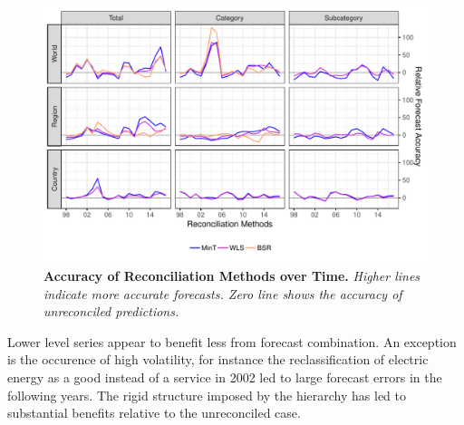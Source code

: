 \documentclass[a4paper,fleqn,11pt]{article}
\begin{document}
 \begin{figure}[H]
	\includegraphics[width=\textwidth]{fig/fig_eval_rmse_time}
	\caption[Accuracy of Reconciliation Methods over Time]{\textbf{Accuracy of Reconciliation Methods over Time.} \textit{Higher lines indicate more accurate forecasts. Zero line shows the accuracy of unreconciled predictions.}} \label{fig:rmse_time}
\end{figure}
Lower level series appear to benefit less from forecast combination. An exception is the occurence of high volatility, for instance the reclassification of electric energy as a good instead of a service in 2002 led to large forecast errors in the following years. The rigid structure imposed by the hierarchy has led to substantial benefits relative to the unreconciled case.\\
\end{document}
